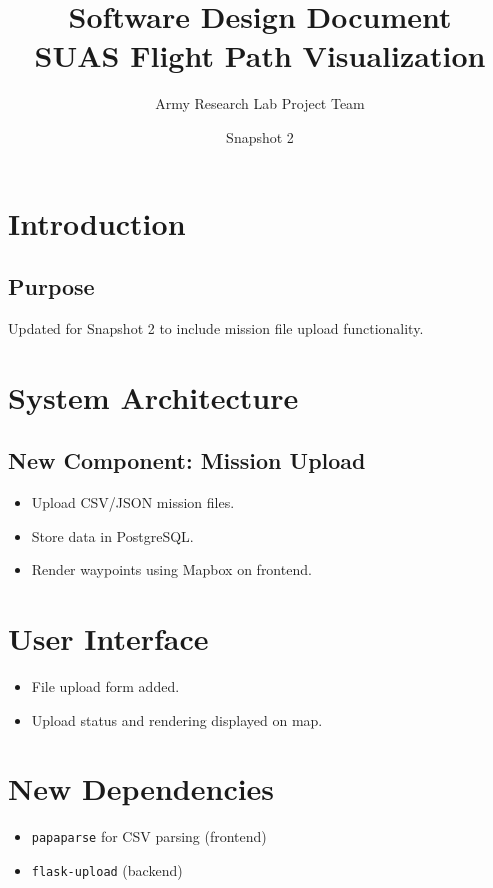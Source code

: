 \documentclass[12pt]{article}
\title{Software Design Document\\SUAS Flight Path Visualization}
\author{Army Research Lab Project Team}
\date{Snapshot 2}
\begin{document}
\maketitle

\tableofcontents
\newpage

\section{Introduction}
\subsection{Purpose}
Updated for Snapshot 2 to include mission file upload functionality.

\section{System Architecture}
\subsection{New Component: Mission Upload}
\begin{itemize}
  \item Upload CSV/JSON mission files.
  \item Store data in PostgreSQL.
  \item Render waypoints using Mapbox on frontend.
\end{itemize}

\section{User Interface}
\begin{itemize}
  \item File upload form added.
  \item Upload status and rendering displayed on map.
\end{itemize}

\section{New Dependencies}
\begin{itemize}
  \item \texttt{papaparse} for CSV parsing (frontend)
  \item \texttt{flask-upload} (backend)
\end{itemize}
\end{document}
